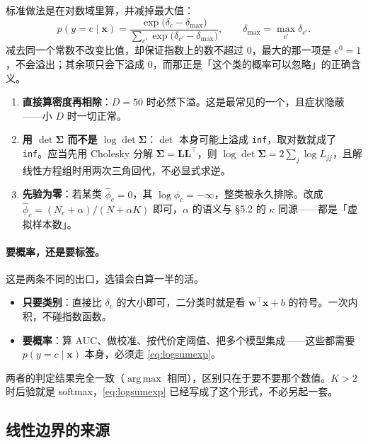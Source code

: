 \documentclass[11pt,a4paper,fontset=windows,zihao=-4]{ctexart}
\newcommand{\bw}{\mathbf{w}}
\newcommand{\bx}{\mathbf{x}}
\newcommand{\bL}{\mathbf{L}}
\newcommand{\bSigma}{\boldsymbol{\Sigma}}
\newcommand{\tp}{^{\top}}
\DeclareMathOperator*{\argmax}{arg\,max}
\begin{document}
标准做法是在对数域里算，并减掉最大值：
\begin{equation}
  p(y=c\mid\bx)=\frac{\exp\bigl(\delta_c-\delta_{\max}\bigr)}{\sum_{c'}\exp\bigl(\delta_{c'}-\delta_{\max}\bigr)},
  \qquad \delta_{\max}=\max_{c'}\delta_{c'} .
  \label{eq:logsumexp}
\end{equation}
减去同一个常数不改变比值，却保证指数上的数不超过 $0$，最大的那一项是 $e^0=1$，不会溢出；其余项只会下溢成 $0$，而那正是「这个类的概率可以忽略」的正确含义。

\begin{warn}[三个常见的数值坑]
\begin{enumerate}[label=\textcolor{gold}{\bfseries(\arabic*)},leftmargin=2.2em]
  \item \textbf{直接算密度再相除}：$D=50$ 时必然下溢。这是最常见的一个，且症状隐蔽——小 $D$ 时一切正常。
  \item \textbf{用 $\det\bSigma$ 而不是 $\log\det\bSigma$}：$\det$ 本身可能上溢成 \texttt{inf}，取对数就成了 \texttt{inf}。应当先用 Cholesky 分解 $\bSigma=\bL\bL\tp$，则 $\log\det\bSigma=2\sum_j\log L_{jj}$，且解线性方程组时用两次三角回代，不必显式求逆。
  \item \textbf{先验为零}：若某类 $\hat\phi_c=0$，其 $\log\phi_c=-\infty$，整类被永久排除。改成 $\hat\phi_c=(N_c+\alpha)/(N+\alpha K)$ 即可，$\alpha$ 的语义与 §5.2 的 $\kappa$ 同源——都是「虚拟样本数」。
\end{enumerate}
\end{warn}

\paragraph{要概率，还是要标签。}这是两条不同的出口，选错会白算一半的活。

\begin{itemize}
  \item \textbf{只要类别}：直接比 $\delta_c$ 的大小即可，二分类时就是看 $\bw\tp\bx+b$ 的符号。一次内积，不碰指数函数。
  \item \textbf{要概率}：算 AUC、做校准、按代价定阈值、把多个模型集成——这些都需要 $p(y=c\mid\bx)$ 本身，必须走 \eqref{eq:logsumexp}。
\end{itemize}

两者的判定结果完全一致（$\argmax$ 相同），区别只在于要不要那个数值。$K>2$ 时后验就是 softmax，\eqref{eq:logsumexp} 已经写成了这个形式，不必另起一套。

\subsection{线性边界的来源}
\end{document}
